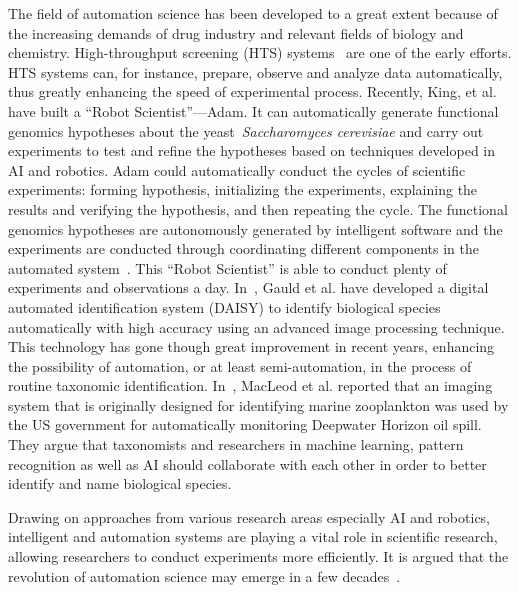 The field of automation science has been developed to a great extent because of the increasing demands of drug industry and relevant fields of biology and chemistry. High-throughput screening (HTS) systems~\cite{Persidis_1998} are one of the early efforts. HTS systems can, for instance,  prepare, observe and analyze data automatically, thus greatly enhancing the speed of experimental process. Recently, King, et al.~\cite{King_2004, King_2009} have built a ``Robot Scientist''---Adam.  It can automatically generate functional genomics hypotheses about the yeast~\textit{Saccharomyces cerevisiae} and carry out experiments to test and refine the hypotheses based on techniques developed in AI and robotics. Adam could automatically conduct the cycles of scientific experiments: forming hypothesis, initializing the experiments, explaining the results and verifying the hypothesis, and then repeating the cycle. The functional genomics hypotheses are autonomously generated by intelligent software and the experiments are conducted through coordinating different components in the automated system~\cite{King_2004}. This ``Robot Scientist'' \cite{King_2009} is able to conduct plenty of experiments and observations a day. In~\cite{Gauld_2000}, Gauld et al. have developed a digital automated identification system (DAISY) to identify biological species automatically with high accuracy using an advanced image processing technique. This technology has gone though great improvement in recent years, enhancing the possibility of automation, or at least semi-automation, in the process of routine taxonomic identification. In~\cite{MacLeod_2010}, MacLeod et al. reported that an imaging system that is originally designed for identifying marine zooplankton was used by the US government for automatically monitoring Deepwater Horizon oil spill. They argue that taxonomists and researchers in machine learning, pattern recognition as well as AI should collaborate with each other in order to better identify and name biological species. 

Drawing on approaches from various research areas especially AI and robotics, intelligent and automation systems are playing a vital role in scientific research, allowing researchers to conduct experiments more efficiently. It is argued that the revolution of automation science may emerge in a few decades~\cite{King_2009}.

